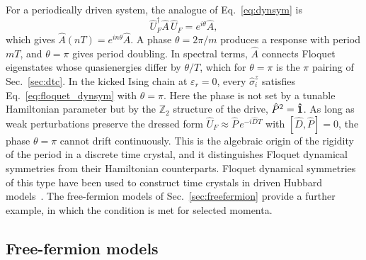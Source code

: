 \documentclass[%
reprint,
superscriptaddress,
amsmath,amssymb,
aps,
prb,
showkeys,%
floatfix,
]{revtex4-2}
\let\cite\citep   %
\begin{document}
	For a periodically driven system, the analogue of Eq.~\eqref{eq:dynsym} is
	\begin{equation}
		\hat{U}_F^\dagger\hat{A}\,\hat{U}_F=e^{i\theta}\hat{A},
		\label{eq:floquet_dynsym}
	\end{equation}
	which gives $\hat{A}(nT)=e^{in\theta}\hat{A}$. A phase $\theta=2\pi/m$ produces a response with period $mT$, and $\theta=\pi$ gives period doubling. In spectral terms, $\hat{A}$ connects Floquet eigenstates whose quasienergies differ by $\theta/T$, which for $\theta=\pi$ is the $\pi$ pairing of Sec.~\ref{sec:dtc}. In the kicked Ising chain at $\varepsilon_r=0$, every $\hat{\sigma}^z_i$ satisfies Eq.~\eqref{eq:floquet_dynsym} with $\theta=\pi$. Here the phase is not set by a tunable Hamiltonian parameter but by the $\mathbb{Z}_2$ structure of the drive, $\hat{P}^2=\bf{\hat{1}}$. As long as weak perturbations preserve the dressed form $\hat{U}_F\approx\hat{P}\,e^{-i\hat{D}T}$ with $[\hat{D},\hat{P}]=0$, the phase $\theta=\pi$ cannot drift continuously. This is the algebraic origin of the rigidity of the period in a discrete time crystal, and it distinguishes Floquet dynamical symmetries from their Hamiltonian counterparts. Floquet dynamical symmetries of this type have been used to construct time crystals in driven Hubbard models~\cite{ChinzeiIkeda2020}. The free-fermion models of Sec.~\ref{sec:freefermion} provide a further example, in which the condition is met for selected momenta.
	
	\subsection{\label{sec:freefermion}Free-fermion models}
	
\end{document}
